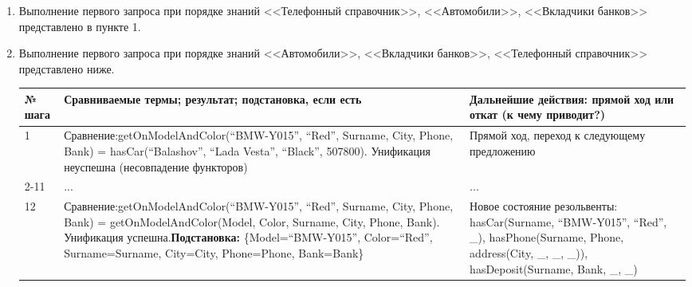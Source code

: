 \documentclass[14pt,a4paper]{scrreprt}
\begin{document}
\begin{enumerate}
	
	\item Выполнение первого запроса при порядке знаний <<Телефонный справочник>>, <<Автомобили>>, <<Вкладчики банков>> представлено в пункте 1.
	
	\item Выполнение первого запроса при порядке знаний <<Автомобили>>, <<Вкладчики банков>>, <<Телефонный справочник>> представлено ниже.
	
\begin{table}[H]
	\centering
	\begin{tabular}{|p{1.2cm\small}|p{9cm\small}|p{5cm\small}|}
		\hline
		№ шага & Сравниваемые термы; результат; подстановка, если есть & Дальнейшие действия: прямой ход или откат (к чему приводит?)\\
		\hline
		1 & Сравнение:\linebreak getOnModelAndColor(``BMW-Y015'', ``Red'', Surname, City, Phone, Bank) = hasCar(``Balashov'', ``Lada Vesta'', ``Black'', 507800). Унификация неуспешна (несовпадение функторов) & Прямой ход, переход к следующему предложению\\
		\hline
		2-11 & ... & ...\\
		\hline
		12 & Сравнение:\linebreak getOnModelAndColor(``BMW-Y015'', ``Red'', Surname, City, Phone, Bank) = getOnModelAndColor(Model, Color, Surname, City, Phone, Bank). Унификация успешна.\linebreak \textbf{Подстановка:} \{Model=``BMW-Y015'', Color=``Red'', Surname=Surname, City=City, Phone=Phone, Bank=Bank\} & Новое состояние резольвенты: hasCar(Surname, ``BMW-Y015'', ``Red'', \_), hasPhone(Surname, Phone, address(City, \_, \_, \_)), hasDeposit(Surname, Bank, \_, \_)\\
		\hline 
	\end{tabular}
\end{table}
		

\end{enumerate}
\end{document}
